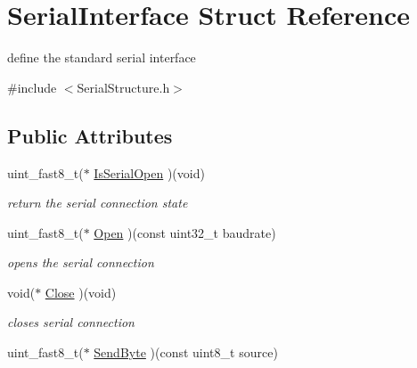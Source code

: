 \hypertarget{struct_serial_interface}{\section{Serial\+Interface Struct Reference}
\label{struct_serial_interface}
}


define the standard serial interface  




{\ttfamily \#include $<$Serial\+Structure.\+h$>$}

\subsection*{Public Attributes}
\begin{DoxyCompactItemize}
\item 
\hypertarget{struct_serial_interface_aa12245208003c78ea024ad24f9d84f2a}{uint\+\_\+fast8\+\_\+t($\ast$ \hyperlink{struct_serial_interface_aa12245208003c78ea024ad24f9d84f2a}{Is\+Serial\+Open} )(void)}\label{struct_serial_interface_aa12245208003c78ea024ad24f9d84f2a}

\begin{DoxyCompactList}\small\item\em return the serial connection state \end{DoxyCompactList}\item 
\hypertarget{struct_serial_interface_ab506189cbcec1de46dfc75142fb82068}{uint\+\_\+fast8\+\_\+t($\ast$ \hyperlink{struct_serial_interface_ab506189cbcec1de46dfc75142fb82068}{Open} )(const uint32\+\_\+t baudrate)}\label{struct_serial_interface_ab506189cbcec1de46dfc75142fb82068}

\begin{DoxyCompactList}\small\item\em opens the serial connection \end{DoxyCompactList}\item 
\hypertarget{struct_serial_interface_a6a28860e0cb0ab7a3f9c49527e883685}{void($\ast$ \hyperlink{struct_serial_interface_a6a28860e0cb0ab7a3f9c49527e883685}{Close} )(void)}\label{struct_serial_interface_a6a28860e0cb0ab7a3f9c49527e883685}

\begin{DoxyCompactList}\small\item\em closes serial connection \end{DoxyCompactList}\item 
\hypertarget{struct_serial_interface_aac8d6d754ee55b326fa8877cf5b51947}{uint\+\_\+fast8\+\_\+t($\ast$ \hyperlink{struct_serial_interface_aac8d6d754ee55b326fa8877cf5b51947}{Send\+Byte} )(const uint8\+\_\+t source)}\label{struct_serial_interface_aac8d6d754ee55b326fa8877cf5b51947}


\end{DoxyCompactItemize}
